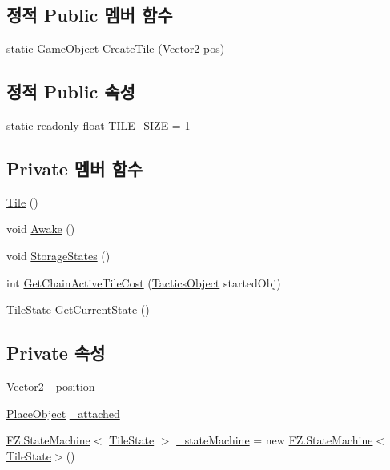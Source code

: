 \subsection*{정적 Public 멤버 함수}
\begin{DoxyCompactItemize}
\item 
static Game\+Object \hyperlink{class_tile_aec3cdb55a67f4c12d3056355c15bdba2}{Create\+Tile} (Vector2 pos)
\end{DoxyCompactItemize}
\subsection*{정적 Public 속성}
\begin{DoxyCompactItemize}
\item 
static readonly float \hyperlink{class_tile_a51b7dea4344573ba12a461a32517e683}{T\+I\+L\+E\+\_\+\+S\+I\+ZE} = 1
\end{DoxyCompactItemize}
\subsection*{Private 멤버 함수}
\begin{DoxyCompactItemize}
\item 
\hyperlink{class_tile_a7684d2e86beeb06d844ebb7819b11b33}{Tile} ()
\item 
void \hyperlink{class_tile_a4fbf82b2a26cdeb792dc78192d7247dc}{Awake} ()
\item 
void \hyperlink{class_tile_a6cb69a9fad04bee1fa3473aec22428de}{Storage\+States} ()
\item 
int \hyperlink{class_tile_a81b4dd833bdeade289583aabbdcaff73}{Get\+Chain\+Active\+Tile\+Cost} (\hyperlink{class_tactics_object}{Tactics\+Object} started\+Obj)
\item 
\hyperlink{class_tile_1_1_tile_state}{Tile\+State} \hyperlink{class_tile_ae37e08e39263e766fdc612de94fb7a0d}{Get\+Current\+State} ()
\end{DoxyCompactItemize}
\subsection*{Private 속성}
\begin{DoxyCompactItemize}
\item 
Vector2 \hyperlink{class_tile_a56d02616cede51da0afdceff82ca958d}{\+\_\+position}
\item 
\hyperlink{class_place_object}{Place\+Object} \hyperlink{class_tile_aa6874cba770df8eeb24e2ac47c749389}{\+\_\+attached}
\item 
\hyperlink{class_f_z_1_1_state_machine}{F\+Z.\+State\+Machine}$<$ \hyperlink{class_tile_1_1_tile_state}{Tile\+State} $>$ \hyperlink{class_tile_a6e1fc020bb66550bfe40c40a18e56910}{\+\_\+state\+Machine} = new \hyperlink{class_f_z_1_1_state_machine}{F\+Z.\+State\+Machine}$<$\hyperlink{class_tile_1_1_tile_state}{Tile\+State}$>$()
\end{DoxyCompactItemize}


